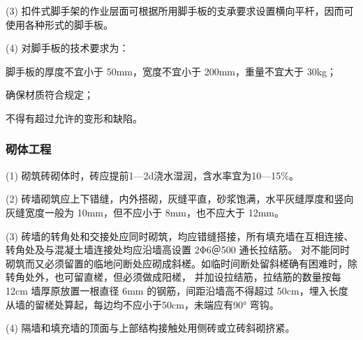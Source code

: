 (3)  扣件式脚手架的作业层面可根据所用脚手板的支承要求设置横向平杆，因而可使用各种形式的脚手板。

(4) 对脚手板的技术要求为：

 脚手板的厚度不宜小于 50mm，宽度不宜小于 200mm，重量不宜大于 30kg；

 确保材质符合规定；

 不得有超过允许的变形和缺陷。


\subsubsection{砌体工程}

(1) 砌筑砖砌体时，砖应提前1—2d浇水湿润，含水率宜为10—15\%。

(2) 砖墙砌筑应上下错缝，内外搭砌，灰缝平直，砂浆饱满，水平灰缝厚度和竖向灰缝宽度一般为 10mm，但不应小于 8mm，也不应大于 12mm。

(3) 砖墙的转角处和交接处应同时砌筑，均应错缝搭接，所有填充墙在互相连接、转角处及与混凝土墙连接处均应沿墙高设置 2Φ6＠500 通长拉结筋。
对不能同时砌筑而又必须留置的临地问断处应砌成斜槎。如临时间断处留斜槎确有困难时，除转角处外，也可留直槎，但必须做成阳槎，
并加设拉结筋，拉结筋的数量按每 12cm 墙厚原放置一根直径 6mm 的钢筋，间距沿墙高不得超过 50cm，埋入长度从墙的留槎处算起，每边均不应小于50cm，未端应有90° 弯钩。

(4) 隔墙和填充墙的顶面与上部结构接触处用侧砖或立砖斜砌挤紧。
